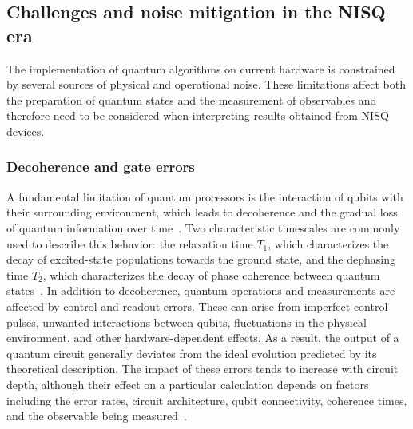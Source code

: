 \subsection{Challenges and noise mitigation in the NISQ era}
The implementation of quantum algorithms on current hardware is constrained by several sources of physical and operational noise. These limitations affect both the preparation of quantum states and the measurement of observables and therefore need to be considered when interpreting results obtained from NISQ devices.
\subsubsection{Decoherence and gate errors}
A fundamental limitation of quantum processors is the interaction of qubits with their surrounding environment, which leads to decoherence and the gradual loss of quantum information over time~\cite{nielsen2010quantum}. Two characteristic timescales are commonly used to describe this behavior: the relaxation time $T_1$, which characterizes the decay of excited-state populations towards the ground state, and the dephasing time $T_2$, which characterizes the decay of phase coherence between quantum states~\cite{error_mitigation_1}.
In addition to decoherence, quantum operations and measurements are affected by control and readout errors. These can arise from imperfect control pulses, unwanted interactions between qubits, fluctuations in the physical environment, and other hardware-dependent effects. As a result, the output of a quantum circuit generally deviates from the ideal evolution predicted by its theoretical description. The impact of these errors tends to increase with circuit depth, although their effect on a particular calculation depends on factors including the error rates, circuit architecture, qubit connectivity, coherence times, and the observable being measured~\cite{nielsen2010quantum}.
